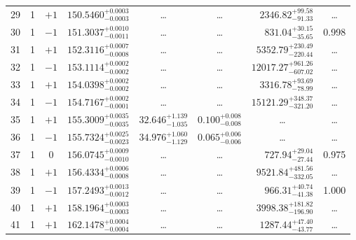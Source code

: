 \begin{table*}[!]
\begin{tabular}{llcrrlrc}
29 & 1 & $+1$ & $    150.5460_{-      0.0003}^{+      0.0003}$ & \multicolumn{1}{c}{\dots} & \multicolumn{1}{c}{\dots} & $     2346.82_{-       91.33}^{+       99.58}$ & \dots \\[1pt]
30 & 1 & $-1$ & $    151.3037_{-      0.0011}^{+      0.0010}$ & \multicolumn{1}{c}{\dots} & \multicolumn{1}{c}{\dots} & $      831.04_{-       35.65}^{+       30.15}$ & 0.998\\[1pt]
31 & 1 & $+1$ & $    152.3116_{-      0.0008}^{+      0.0007}$ & \multicolumn{1}{c}{\dots} & \multicolumn{1}{c}{\dots} & $     5352.79_{-      220.44}^{+      230.49}$ & \dots \\[1pt]
32 & 1 & $-1$ & $    153.1114_{-      0.0002}^{+      0.0002}$ & \multicolumn{1}{c}{\dots} & \multicolumn{1}{c}{\dots} & $    12017.27_{-      607.02}^{+      961.26}$ & \dots \\[1pt]
33 & 1 & $+1$ & $    154.0398_{-      0.0002}^{+      0.0002}$ & \multicolumn{1}{c}{\dots} & \multicolumn{1}{c}{\dots} & $     3316.78_{-       78.99}^{+       93.69}$ & \dots \\[1pt]
34 & 1 & $-1$ & $    154.7167_{-      0.0001}^{+      0.0002}$ & \multicolumn{1}{c}{\dots} & \multicolumn{1}{c}{\dots} & $    15121.29_{-      321.20}^{+      348.37}$ & \dots \\[1pt]
35 & 1 & $+1$ & $    155.3009_{-      0.0035}^{+      0.0035}$ & $      32.646_{-       1.035}^{+       1.139}$ & $       0.100_{-       0.008}^{+       0.008}$ & \multicolumn{1}{c}{\dots} & \dots \\[1pt]
36 & 1 & $-1$ & $    155.7324_{-      0.0023}^{+      0.0025}$ & $      34.976_{-       1.129}^{+       1.060}$ & $       0.065_{-       0.006}^{+       0.006}$ & \multicolumn{1}{c}{\dots} & \dots \\[1pt]
37 & 1 & 0 & $    156.0745_{-      0.0010}^{+      0.0009}$ & \multicolumn{1}{c}{\dots} & \multicolumn{1}{c}{\dots} & $      727.94_{-       27.44}^{+       29.04}$ & 0.975\\[1pt]
38 & 1 & $+1$ & $    156.4334_{-      0.0008}^{+      0.0006}$ & \multicolumn{1}{c}{\dots} & \multicolumn{1}{c}{\dots} & $     9521.84_{-      332.05}^{+      481.56}$ & \dots \\[1pt]
39 & 1 & $-1$ & $    157.2493_{-      0.0012}^{+      0.0013}$ & \multicolumn{1}{c}{\dots} & \multicolumn{1}{c}{\dots} & $      966.31_{-       41.38}^{+       40.74}$ & 1.000\\[1pt]
40 & 1 & $+1$ & $    158.1964_{-      0.0003}^{+      0.0003}$ & \multicolumn{1}{c}{\dots} & \multicolumn{1}{c}{\dots} & $     3998.38_{-      196.90}^{+      181.82}$ & \dots \\[1pt]
41 & 1 & $+1$ & $    162.1478_{-      0.0004}^{+      0.0004}$ & \multicolumn{1}{c}{\dots} & \multicolumn{1}{c}{\dots} & $     1287.44_{-       43.77}^{+       47.40}$ & \dots \\[1pt]


\end{tabular}
\end{table*}
